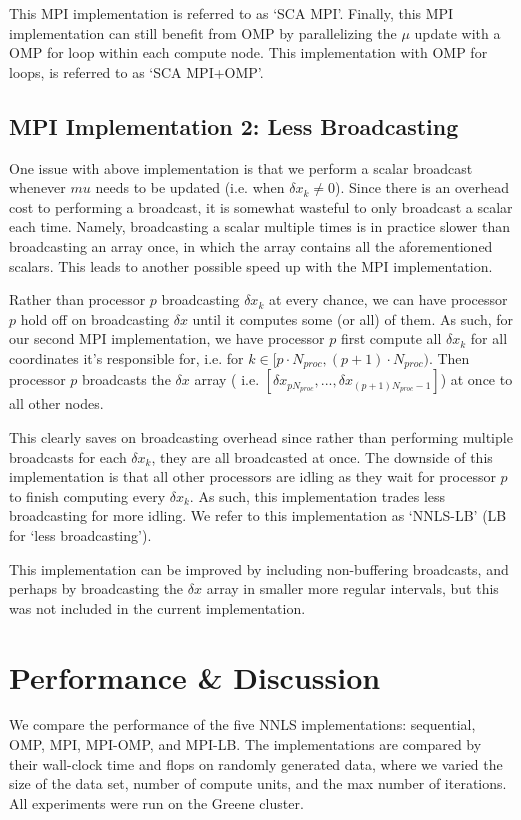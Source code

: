 \documentclass{article}
\begin{document}
This MPI implementation is referred to as `SCA MPI'. Finally, this MPI implementation can still benefit from OMP by parallelizing the $\mu$ update with a OMP for loop within each compute node. This implementation with OMP for loops, is referred to as `SCA MPI+OMP'.

\subsection{MPI Implementation 2: Less Broadcasting}
One issue with above implementation is that we perform a scalar broadcast whenever $mu$ needs to be updated (i.e. when $\delta x_k \neq 0$). Since there is an overhead cost to performing a broadcast, it is somewhat wasteful to only broadcast a scalar each time. Namely, broadcasting a scalar multiple times is in practice slower than broadcasting an array once, in which the array contains all the aforementioned scalars. This leads to another possible speed up with the MPI implementation.

Rather than processor $p$ broadcasting $\delta x_k$ at every chance, we can have processor $p$ hold off on broadcasting $\delta x$ until it computes some (or all) of them. As such, for our second MPI implementation, we have processor $p$ first compute all $\delta x_k$ for all coordinates it's responsible for, i.e. for $k \in [p \cdot N_{proc}, (p+1) \cdot N_{proc} )$. Then processor $p$ broadcasts the $\delta x$ array ( i.e. $[ \delta x_{pN_{proc}}, ... , \delta x_{(p+1) N_{proc} - 1}]$) at once to all other nodes.

This clearly saves on broadcasting overhead since rather than performing multiple broadcasts for each $\delta x_k$, they are all broadcasted at once. The downside of this implementation is that all other processors are idling as they wait for processor $p$ to finish computing every $\delta x_k$. As such, this implementation trades less broadcasting for more idling. We refer to this implementation as `NNLS-LB' (LB for `less broadcasting').

This implementation can be improved by including non-buffering broadcasts, and perhaps by broadcasting the $\delta x$ array in smaller more regular intervals, but this was not included in the current implementation.


\section*{Performance \& Discussion}
We compare the performance of the five NNLS implementations: sequential, OMP, MPI, MPI-OMP, and MPI-LB. The implementations are compared by their wall-clock time and flops on randomly generated data, where we varied the size of the data set, number of compute units, and the max number of iterations. All experiments were run on the Greene cluster.
\end{document}
